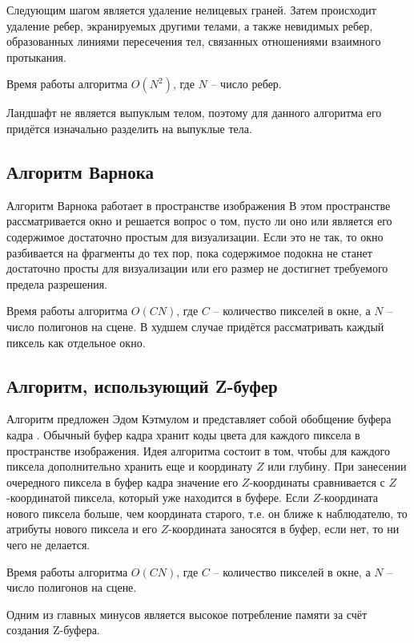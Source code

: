 Следующим шагом является удаление нелицевых граней. Затем происходит удаление ребер, экранируемых другими телами, а также невидимых ребер, образованных линиями пересечения тел, связанных отношениями взаимного протыкания.

Время работы алгоритма $O(N^2)$, где $N$ -- число ребер.

Ландшафт не является выпуклым телом, поэтому для данного алгоритма его придётся изначально разделить на выпуклые тела.

\subsection{Алгоритм Варнока}

Алгоритм Варнока работает в пространстве изображения \cite{varnok} В этом
пространстве рассматривается окно и решается вопрос о том, пусто ли оно
или является его содержимое достаточно простым для визуализации. Если
это не так, то окно разбивается на фрагменты до тех пор, пока содержимое
подокна не станет достаточно просты для визуализации или его размер не
достигнет требуемого предела разрешения. 

Время работы алгоритма $O(CN)$, где $C$ -- количество пикселей в окне, а $N$ -- число полигонов на сцене. В худшем случае придётся рассматривать каждый пиксель как отдельное окно.

\subsection{Алгоритм, использующий Z-буфер}

Алгоритм предложен Эдом Кэтмулом и представляет собой обобщение буфера кадра \cite{algorithms}. Обычный буфер кадра хранит коды цвета для каждого пиксела в пространстве изображения. Идея алгоритма состоит в том, чтобы для каждого пиксела дополнительно хранить еще и координату $Z$ или глубину. При занесении очередного пиксела в буфер кадра значение его $Z$-координаты сравнивается с $Z$-координатой пиксела, который уже находится в буфере. Если $Z$-координата нового пиксела больше, чем координата старого, т.е. он ближе к наблюдателю, то атрибуты нового пиксела и его $Z$-координата заносятся в буфер, если нет, то ни чего не делается. 

Время работы алгоритма $O(CN)$, где $C$ -- количество пикселей в окне, а $N$ -- число полигонов на сцене. 

Одним из главных минусов является высокое потребление памяти за счёт создания Z-буфера.

